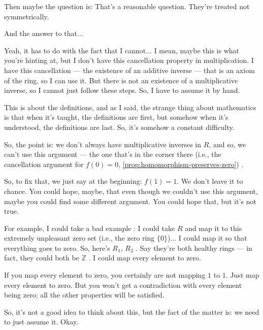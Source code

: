 \begin{speech}[00:22:25 - 00:24:16]
Then maybe the question is:  That's a reasonable question. They're treated not symmetrically.

And the answer to that... 

Yeah, it has to do with the fact that I cannot... I mean, maybe this is what you're hinting at, but I don't have this cancellation property in multiplication. I have this cancellation --- the existence of an additive inverse --- that is an axiom of the ring, so I can use it. But there is not an existence of a multiplicative inverse, so I cannot just follow these steps. So, I have to assume it by hand.

This is about the definitions, and as I said, the strange thing about mathematics is that when it's taught, the definitions are first, but somehow when it's understood, the definitions are last. So, it's somehow a constant difficulty. 

So, the point is: we don't always have multiplicative inverses in $R$, and so, we can't use this argument  --- the one that's in the corner there (i.e., the cancellation argument for $f(0) = 0$, \cref{prop:homomorphism-preserves-zero}) .

So, to fix that, we just say at the beginning: $f(1) = 1$. We don't leave it to chance. You could hope, maybe, that even though we couldn't use this argument, maybe you could find some different argument. You could hope that, but it's not true.
\end{speech}

\begin{speech}[00:24:16 - 00:25:08]
For example, I could take a bad example : I could take $R$ and map it to this extremely unpleasant zero set (i.e., the zero ring $\{0\}$)... I could map it so that everything goes to zero. So, here's $R_1$, $R_2$ . Say they're both healthy rings --- in fact, they could both be $\mathbb{Z}$ . I could map every element to zero.

If you map every element to zero, you certainly are not mapping $1$ to $1$. Just map every element to zero. But you won't get a contradiction with every element being zero; all the other properties will be satisfied.

So, it's not a good idea to think about this, but the fact of the matter is: we need to just assume it.  Okay.
\end{speech}

